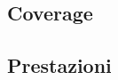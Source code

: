 \documentclass[%
]{beamer}
\begin{document}

        \subsection{Coverage}\label{subsec:coverage}
            \begin{frame}
                \frametitle{\insertsection}
                \framesubtitle{\insertsubsection}
                \centering
            \end{frame}

        \subsection{Prestazioni}\label{subsec:benchmark}
            \begin{frame}
                \frametitle{\insertsection}
                \framesubtitle{\insertsubsection}
                \centering
                
            \end{frame}
\end{document}
